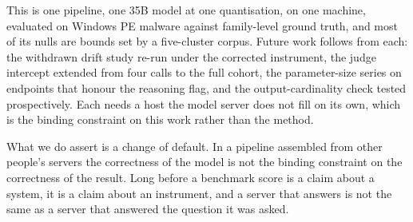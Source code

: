 This is one pipeline, one 35B model at one quantisation, on one machine, evaluated on Windows PE
malware against family-level ground truth, and most of its nulls are bounds set by a five-cluster
corpus. Future work follows from each: the withdrawn drift study re-run under the corrected
instrument, the judge intercept extended from four calls to the full cohort, the parameter-size
series on endpoints that honour the reasoning flag, and the output-cardinality check tested
prospectively. Each needs a host the model server does not fill on its own, which is the binding
constraint on this work rather than the method.

What we do assert is a change of default. In a pipeline assembled from other people's servers the
correctness of the model is not the binding constraint on the correctness of the result. Long before
a benchmark score is a claim about a system, it is a claim about an instrument, and a server that
answers is not the same as a server that answered the question it was asked.
